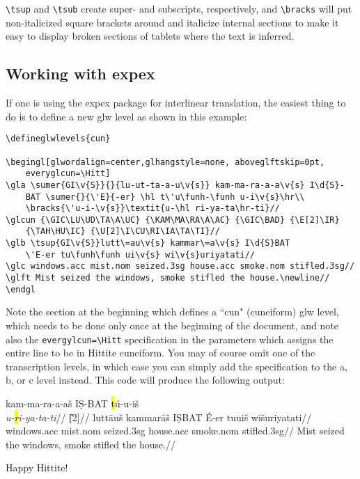 \documentclass[12pt,A4]{article}
\begin{document}
\verb|\tsup| and \verb|\tsub| create super- and subscripts, respectively, and \verb|\bracks| will put non-italicized square brackets around and italicize internal sections to make it easy to display broken sections of tablets where the text is inferred.

\subsection{Working with expex}

If one is using the expex package for interlinear translation, the easiest thing to do is to define a new glw level as shown in this example:
\begin{verbatim}
\defineglwlevels{cun}

\begingl[glwordalign=center,glhangstyle=none, aboveglftskip=0pt, 
    everyglcun=\Hitt]
\gla \sumer{GI\v{S}}{}{lu-ut-ta-a-u\v{s}} kam-ma-ra-a-a\v{s} I\d{S}-
    BAT \sumer{}{\'E}{-er} \hl t\'u\funh-\funh u-i\v{s}\hr\\ 
    \bracks{\'u-i-\v{s}}\textit{u-\hl ri-ya-ta\hr-ti}//
\glcun {\GIC\LU\UD\TA\A\UC} {\KAM\MA\RA\A\AC} {\GIC\BAD} {\E[2]\IR} 
    {\TAH\HU\IC} {\U[2]\I\CU\RI\IA\TA\TI}//
\glb \tsup{GI\v{S}}lutt\=au\v{s} kammar\=a\v{s} I\d{S}BAT 
    \'E-er tu\funh\funh ui\v{s} wi\v{s}uriyatati//
\glc windows.acc mist.nom seized.3sg house.acc smoke.nom stifled.3sg//
\glft Mist seized the windows, smoke stifled the house.\newline//
\endgl
\end{verbatim}

Note the section at the beginning which defines a ``cun" (cuneiform) glw level, which needs to be done only once at the beginning of the document, and note also the \verb|evergylcun=\Hitt| specification in the parameters which assigns the entire line to be in Hittite cuneiform. You may of course omit one of the transcription levels, in which case you can simply add the specification to the a, b, or c level instead. This code will produce the following output:\\


    \begingl[glwordalign=center,glhangstyle=none, aboveglftskip=0pt, everyglcun=\Hitt]
    \gla {} kam-ma-ra-a-a\v{s} I\d{S}-BAT  \hl t\'u\funh-\funh u-i\v{s}\hr\\ \textit{u-\hl ri-ya-ta\hr-ti}//
    \glcun {\GIC\LU\UD\TA\A\UC} {\KAM\MA\RA\A\AC} {\GIC\BAD} {\E[2]\IR} {\TAH\HU\IC} {\U[2]\I\CU\RI\IA\TA\TI}//
    \glb {}lutt\=au\v{s} kammar\=a\v{s} I\d{S}BAT \'E-er tu\funh\funh ui\v{s} wi\v{s}uriyatati//
    \glc windows.acc mist.nom seized.3sg house.acc smoke.nom stifled.3sg//
    \glft Mist seized the windows, smoke stifled the house.\newline//
    \endgl

Happy Hittite!
\end{document}
